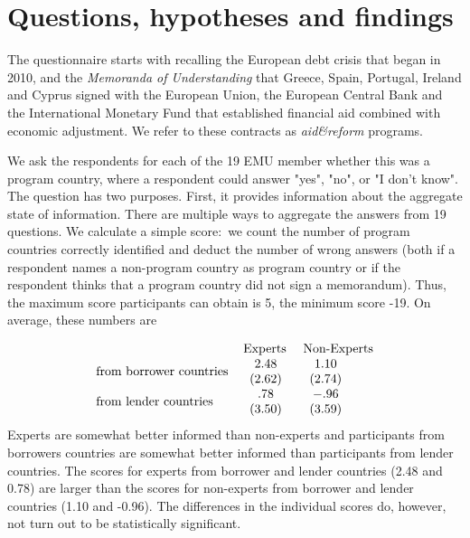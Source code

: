 
\section{Questions, hypotheses and findings}

The questionnaire starts with recalling the European debt
crisis that began in 2010, and the \textit{Memoranda of Understanding}
that Greece, Spain, Portugal, Ireland and Cyprus signed with the European
Union, the European Central Bank and the International Monetary Fund that  
established financial aid combined with economic adjustment. We refer to
these contracts as \textit{aid\&reform} programs. 

We ask the respondents for each of the 19 EMU member whether
this was a program country, where a respondent could answer "yes",
"no", or "I don't know". The question has two purposes. First, it provides
information about the aggregate state of information. There are multiple
ways to aggregate the answers from 19 questions. %
We
calculate a simple score:\ we count the number of program countries
correctly identified and deduct the number of wrong answers (both if a
respondent names a non-program country as program country or if the
respondent thinks that a program country did not sign a memorandum). Thus, the maximum score participants can obtain is 5, the minimum score -19. On
average, these numbers are

\begin{equation*}
\begin{tabular}{lll}
& Experts & Non-Experts \\ 
from borrower countries & $%
\begin{array}{c}
2.48 \\ 
(2.62)%
\end{array}%
$ & $%
\begin{array}{c}
1.10 \\ 
(2.74)%
\end{array}%
$ \\ 
from lender countries & $%
\begin{array}{c}
.78 \\ 
(3.50)%
\end{array}%
$ & $%
\begin{array}{c}
-.96 \\ 
(3.59)%
\end{array}%
$%
\end{tabular}%
\end{equation*}%
Experts are somewhat better informed than non-experts and participants from borrowers countries are somewhat better informed than participants from lender countries. The scores for experts from borrower and lender countries (2.48 and 0.78) are larger than the scores for non-experts from borrower and lender countries (1.10 and -0.96). The differences in the individual scores do, however, not turn out to be statistically significant.

